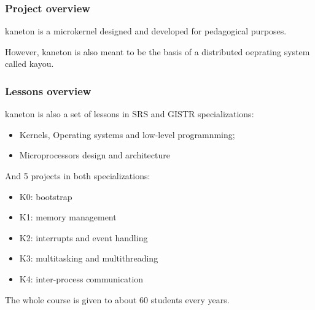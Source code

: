 
\begin{frame}
  \frametitle{Project overview}

  kaneton is a microkernel designed and developed for pedagogical
  purposes.

  \begin{center}
  \end{center}

  However, kaneton is also meant to be the basis of a distributed
  oeprating system called kayou.

\end{frame}


\begin{frame}
  \frametitle{Lessons overview}

  kaneton is also a set of lessons in SRS and GISTR specializations:

  \begin{itemize}
  \item
    Kernels, Operating systems and low-level programnming;
  \item
    Microprocessors design and architecture
  \end{itemize}

  \-

  And 5 projects in both specializations:

  \begin{itemize}
  \item
    K0: bootstrap
  \item
    K1: memory management
  \item
    K2: interrupts and event handling
  \item
    K3: multitasking and multithreading
  \item
    K4: inter-process communication
  \end{itemize}

  \-

  The whole course is given to about 60 students every years.

\end{frame}


